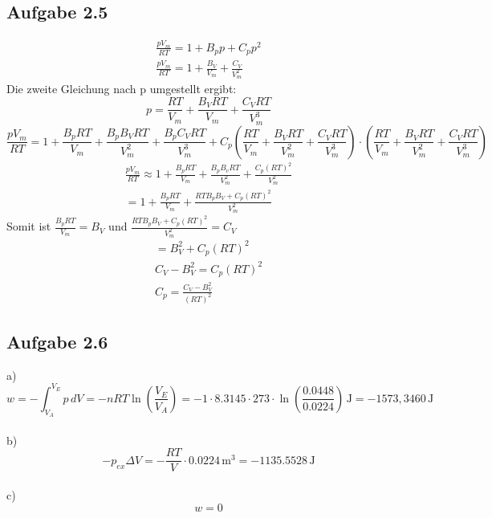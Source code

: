 \documentclass{article}
\begin{document}
\subsection*{Aufgabe 2.5}
\begin{eqnarray*}
    \frac{pV_m}{RT}=1+B_pp+C_pp^2\\
    \frac{pV_m}{RT}=1+\frac{B_V}{V_m}+\frac{C_V}{V_m^2}
\end{eqnarray*}
Die zweite Gleichung nach p umgestellt ergibt:
\begin{equation*}
    p = \frac{RT}{V_m}+\frac{B_VRT}{V_m}+\frac{C_VRT}{V_m^3}
\end{equation*}
\begin{equation*}
    \frac{pV_m}{RT}=1+\frac{B_pRT}{V_m}+\frac{B_pB_VRT}{V_m^2}+\frac{B_pC_VRT}{V_m^3}+C_p\left(\frac{RT}{V_m}+\frac{B_VRT}{V_m^2}+\frac{C_VRT}{V_m^3}\right)\cdot\left(\frac{RT}{V_m}+\frac{B_VRT}{V_m^2}+\frac{C_VRT}{V_m^3}\right)
\end{equation*}
\begin{eqnarray*}
    \frac{pV_m}{RT}\approx 1 + \frac{B_pRT}{V_m}+\frac{B_pB_vRT}{V_m^2}+\frac{C_p(RT)^2}{V_m^2}\\
    =1+\frac{B_pRT}{V_m}+\frac{RTB_pB_V+C_p(RT)^2}{V_m^2}
\end{eqnarray*}
Somit ist $\frac{B_pRT}{V_m} = B_V$ und $\frac{RTB_pB_V+C_p(RT)^2}{V_m^2} = C_V$
\begin{eqnarray*}
    = B_V^2+C_p(RT)^2\\
    C_V - B_V^2 = C_p(RT)^2\\
    C_p = \frac{C_V-B_V^2}{(RT)^2}
\end{eqnarray*}

\subsection*{Aufgabe 2.6}
a)
\begin{equation*}
    w = -\int_{V_A}^{V_E} p\,dV = -nRT\ln\left(\frac{V_E}{V_A}\right) = -1\cdot 8.3145 \cdot 273 \cdot \ln\left(\frac{0.0448}{0.0224}\right) \,\mathrm{J}= -1573,3460 \,\mathrm{J}
\end{equation*}
\\b)
\begin{equation*}
    -p_{ex}\Delta V = -\frac{RT}{V} \cdot 0.0224\,\mathrm{m^3}=-1135.5528\,\mathrm{J}
\end{equation*}
\\c)
\begin{equation*}
    w = 0
\end{equation*}
\end{document}
